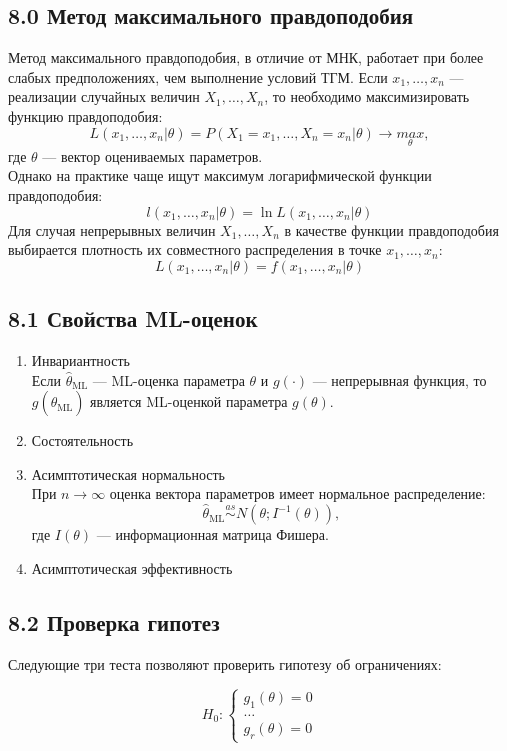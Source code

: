 \documentclass[a0,final]{a0poster}
\begin{document}
\begin{multicols}{4}
\section*{8.0 Метод максимального правдоподобия}
Метод максимального правдоподобия, в отличие от МНК, работает при более слабых предположениях, чем выполнение условий ТГМ. Если $x_1, \ldots, x_n$ — реализации случайных величин $X_1, \ldots, X_n$, то необходимо максимизировать функцию правдоподобия:\\
\[L(x_1, \ldots, x_n|\theta) = P(X_1=x_1, \ldots, X_n=x_n|\theta) \rightarrow \underset{\theta}{max},\]
где $\theta$ — вектор оцениваемых параметров.\\
Однако на практике чаще ищут максимум логарифмической функции правдоподобия:
\[l(x_1, \ldots, x_n|\theta) = \ln L(x_1, \ldots, x_n|\theta)\]
Для случая непрерывных величин $X_1, \ldots, X_n$ в качестве функции правдоподобия выбирается плотность их совместного распределения в точке $x_1, \ldots, x_n$:
\[L(x_1, \ldots, x_n|\theta) = f(x_1, \ldots, x_n|\theta)\]
\subsection*{8.1 Свойства ML-оценок}
\begin{enumerate}
\item Инвариантность\\
Если $\hat{\theta}_{\text{ML}}$ — ML-оценка параметра $\theta$ и $g(\cdot)$ — непрерывная функция, то $g(\hat{\theta}_{\text{ML}})$ является ML-оценкой параметра $g(\theta)$.
\item Состоятельность
\item Асимптотическая нормальность\\
При $n \rightarrow \infty$ оценка вектора параметров имеет нормальное распределение:
\[\hat{\theta}_{\text{ML}} \overset{as}{\sim} N(\theta; I^{-1}(\theta)),\]
где $I(\theta)$ — информационная матрица Фишера.
\item Асимптотическая эффективность
\end{enumerate}

\subsection*{8.2 Проверка гипотез}
Следующие три теста позволяют проверить гипотезу об ограничениях:
\setlength{\columnseprule}{0pt}
\begin{multicols}{2}
  \begin{equation*}
    H_0:
\begin{cases}
    g_1(\theta)=0 \\
    \ldots \\
    g_r(\theta)=0
\end{cases}
  \end{equation*}\break


\end{multicols}
\end{multicols}
\end{document}
